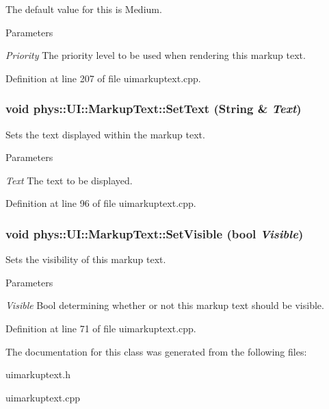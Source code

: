 The default value for this is Medium. 
\begin{DoxyParams}{Parameters}
\item[{\em Priority}]The priority level to be used when rendering this markup text. \end{DoxyParams}


Definition at line 207 of file uimarkuptext.cpp.

\hypertarget{classphys_1_1UI_1_1MarkupText_af5d9184959b56996e9727e2d7ccf8f22}{
\subsubsection[{SetText}]{\setlength{\rightskip}{0pt plus 5cm}void phys::UI::MarkupText::SetText ({\bf String} \& {\em Text})}}
\label{d7/d23/classphys_1_1UI_1_1MarkupText_af5d9184959b56996e9727e2d7ccf8f22}


Sets the text displayed within the markup text. 


\begin{DoxyParams}{Parameters}
\item[{\em Text}]The text to be displayed. \end{DoxyParams}


Definition at line 96 of file uimarkuptext.cpp.

\hypertarget{classphys_1_1UI_1_1MarkupText_ac5c38c21af2fbc3533697cacfec8fdc3}{
\subsubsection[{SetVisible}]{\setlength{\rightskip}{0pt plus 5cm}void phys::UI::MarkupText::SetVisible (bool {\em Visible})}}
\label{d7/d23/classphys_1_1UI_1_1MarkupText_ac5c38c21af2fbc3533697cacfec8fdc3}


Sets the visibility of this markup text. 


\begin{DoxyParams}{Parameters}
\item[{\em Visible}]Bool determining whether or not this markup text should be visible. \end{DoxyParams}


Definition at line 71 of file uimarkuptext.cpp.



The documentation for this class was generated from the following files:\begin{DoxyCompactItemize}
\item 
uimarkuptext.h\item 
uimarkuptext.cpp\end{DoxyCompactItemize}
